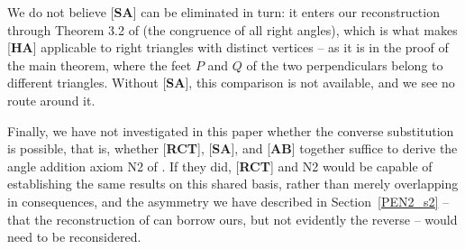 \documentclass[11pt,a4paper]{article}
\theoremstyle{definition}
\theoremstyle{remark}
\numberwithin{equation}{section}
\begin{document}
We do not believe [\textbf{SA}] can be eliminated in turn: it enters our reconstruction
through Theorem 3.2 of \cite[Section~3]{Volpe2026I} (the congruence of all right
angles), which is
what makes [\textbf{HA}] applicable to right triangles with distinct vertices -- as it is in
the proof of the main theorem, where the feet $P$ and $Q$ of the two perpendiculars belong to
different triangles. Without [\textbf{SA}], this comparison is not available, and we see no
route around it.

Finally, we have not investigated in this paper whether the converse substitution is
possible, that is, whether [\textbf{RCT}], [\textbf{SA}], and [\textbf{AB}] together suffice
to derive the angle addition axiom N2 of \cite{Donnelly2025}. If they did, [\textbf{RCT}] and
N2 would be capable of establishing the same results on this shared basis, rather than
merely overlapping in consequences, and the asymmetry we have described in
Section~\ref{PEN2_s2} -- that the reconstruction of \cite{Donnelly2025} can borrow ours, but
not evidently the reverse -- would need to be reconsidered.
\end{document}
